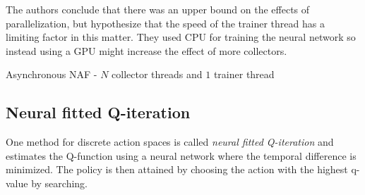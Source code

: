 The authors conclude that there was an upper bound on the effects of
parallelization, but hypothesize that the speed of the trainer thread has a
limiting factor in this matter. They used CPU for training the neural network
so instead using a GPU might increase the effect of more collectors.

\begin{algorithm}[!h]
    \caption{Asynchronous NAF - $N$ collector threads and $1$ trainer thread}
    \begin{algorithmic}
        \ENDFOR
            \ENDFOR
        \ENDFOR
    \end{algorithmic}
    \label{algo:async_naf}
\end{algorithm}

\subsection{Neural fitted Q-iteration}

One method for discrete action spaces is called \textit{neural fitted Q-iteration} \cite{riedmiller2005neural}
and estimates the Q-function using a neural network where the temporal difference is minimized. The
policy is then attained by choosing the action with the highest q-value by searching.

